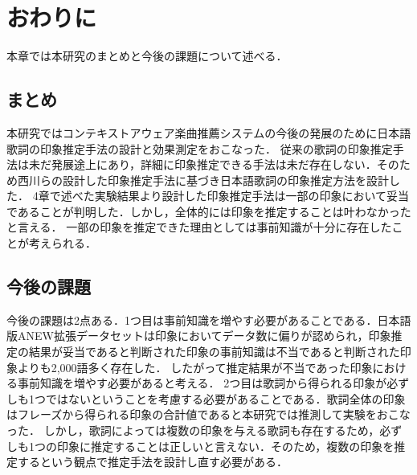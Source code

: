 \documentclass[a4paper,11pt,oneside,openany]{jsbook}
\begin{document}
\chapter{おわりに}
本章では本研究のまとめと今後の課題について述べる．
\section{まとめ}
本研究ではコンテキストアウェア楽曲推薦システムの今後の発展のために日本語歌詞の印象推定手法の設計と効果測定をおこなった．
従来の歌詞の印象推定手法は未だ発展途上にあり，詳細に印象推定できる手法は未だ存在しない．そのため西川らの設計した印象推定手法に基づき日本語歌詞の印象推定方法を設計した．
4章で述べた実験結果より設計した印象推定手法は一部の印象において妥当であることが判明した．しかし，全体的には印象を推定することは叶わなかったと言える．
一部の印象を推定できた理由としては事前知識が十分に存在したことが考えられる．
\section{今後の課題}
今後の課題は2点ある．1つ目は事前知識を増やす必要があることである．日本語版ANEW拡張データセットは印象においてデータ数に偏りが認められ，印象推定の結果が妥当であると判断された印象の事前知識は不当であると判断された印象よりも2,000語多く存在した．
したがって推定結果が不当であった印象における事前知識を増やす必要があると考える．
2つ目は歌詞から得られる印象が必ずしも1つではないということを考慮する必要があることである．歌詞全体の印象はフレーズから得られる印象の合計値であると本研究では推測して実験をおこなった．
しかし，歌詞によっては複数の印象を与える歌詞も存在するため，必ずしも1つの印象に推定することは正しいと言えない．そのため，複数の印象を推定するという観点で推定手法を設計し直す必要がある．
\end{document}
